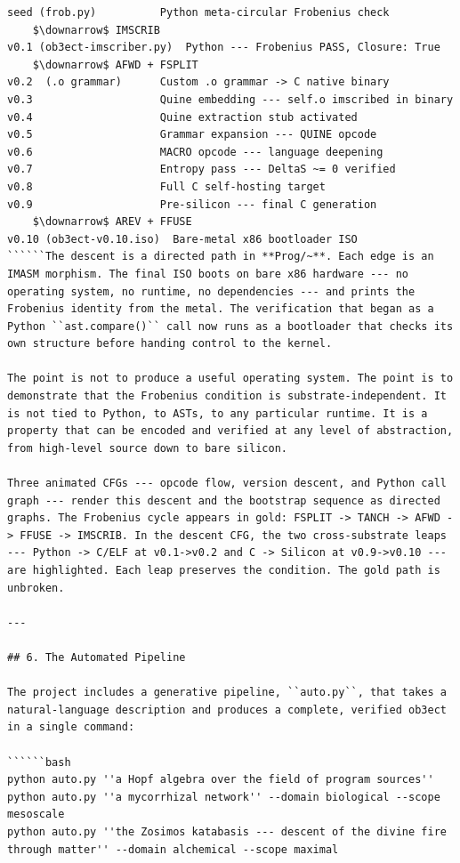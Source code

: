 \documentclass[12pt,a4paper]{article}
\begin{document}
\begin{lstlisting}
seed (frob.py)          Python meta-circular Frobenius check
    $\downarrow$ IMSCRIB
v0.1 (ob3ect-imscriber.py)  Python --- Frobenius PASS, Closure: True
    $\downarrow$ AFWD + FSPLIT
v0.2  (.o grammar)      Custom .o grammar -> C native binary
v0.3                    Quine embedding --- self.o imscribed in binary
v0.4                    Quine extraction stub activated
v0.5                    Grammar expansion --- QUINE opcode
v0.6                    MACRO opcode --- language deepening
v0.7                    Entropy pass --- DeltaS ~= 0 verified
v0.8                    Full C self-hosting target
v0.9                    Pre-silicon --- final C generation
    $\downarrow$ AREV + FFUSE
v0.10 (ob3ect-v0.10.iso)  Bare-metal x86 bootloader ISO
``````The descent is a directed path in **Prog/~**. Each edge is an IMASM morphism. The final ISO boots on bare x86 hardware --- no operating system, no runtime, no dependencies --- and prints the Frobenius identity from the metal. The verification that began as a Python ``ast.compare()`` call now runs as a bootloader that checks its own structure before handing control to the kernel.

The point is not to produce a useful operating system. The point is to demonstrate that the Frobenius condition is substrate-independent. It is not tied to Python, to ASTs, to any particular runtime. It is a property that can be encoded and verified at any level of abstraction, from high-level source down to bare silicon.

Three animated CFGs --- opcode flow, version descent, and Python call graph --- render this descent and the bootstrap sequence as directed graphs. The Frobenius cycle appears in gold: FSPLIT -> TANCH -> AFWD -> FFUSE -> IMSCRIB. In the descent CFG, the two cross-substrate leaps --- Python -> C/ELF at v0.1->v0.2 and C -> Silicon at v0.9->v0.10 --- are highlighted. Each leap preserves the condition. The gold path is unbroken.

---

## 6. The Automated Pipeline

The project includes a generative pipeline, ``auto.py``, that takes a natural-language description and produces a complete, verified ob3ect in a single command:

``````bash
python auto.py ''a Hopf algebra over the field of program sources''
python auto.py ''a mycorrhizal network'' --domain biological --scope mesoscale
python auto.py ''the Zosimos katabasis --- descent of the divine fire through matter'' --domain alchemical --scope maximal
\end{lstlisting}
\end{document}
